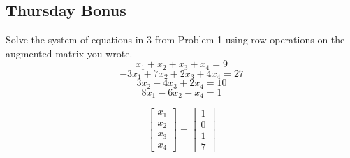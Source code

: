 \documentclass[11pt]{article}
\theoremstyle{definition}
\theoremstyle{remark}
\begin{document}
\subsection*{Thursday Bonus}
Solve the system of equations in 3 from Problem 1 using row operations on the augmented matrix you wrote.
$$x_1 + x_2 + x_3 + x_4 = 9$$
$$-3x_1 + 7x_2 + 2x_3 + 4x_4 = 27$$
$$3x_2 - 4x_3 + 2x_4 = 10$$
$$8x_1 - 6x_2 - x_4 = 1$$

{\color{red}
$$ \begin{bmatrix} x_1 \\ x_2 \\ x_3 \\ x_4 \end{bmatrix} = \begin{bmatrix} 1 \\ 0 \\ 1 \\7 \end{bmatrix} $$
}
\end{document}
